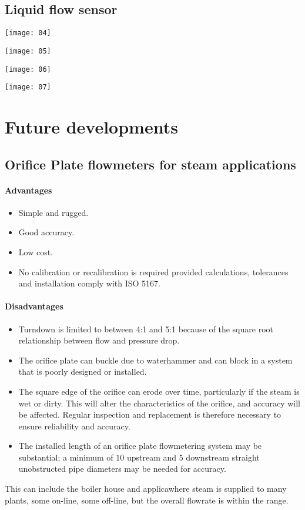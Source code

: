 \clearpage
\subsection{Liquid flow sensor}
\begin{center}
	\texttt{[image: 04]}
\end{center}
\begin{center}
	\texttt{[image: 05]}
\end{center}
\clearpage
\begin{center}
	\texttt{[image: 06]}
\end{center}
\begin{center}
	\texttt{[image: 07]}
\end{center}
\section{Future developments}
\subsection{Orifice Plate flowmeters for steam applications}
\paragraph{Advantages}
\begin{itemize}
	\item Simple and rugged.
	\item Good accuracy.
	\item Low cost.
	\item No calibration or recalibration is required provided calculations, tolerances and installation comply with ISO 5167.
\end{itemize}
\paragraph{Disadvantages}
\begin{itemize}
	\item Turndown is limited to between 4:1 and 5:1 because of the square root relationship between flow and pressure drop.
	\item The orifice plate can buckle due to waterhammer and can block in a system that is poorly designed or installed.
	\item The square edge of the orifice can erode over time, particularly if the steam is wet or dirty. This will alter the characteristics of the orifice, and accuracy will be affected. Regular inspection and replacement is therefore necessary to ensure reliability and accuracy.
	\item The installed length of an orifice plate flowmetering system may be substantial; a minimum of 10 upstream and 5 downstream straight unobstructed pipe diameters may be needed for accuracy.
\end{itemize}
This can include the boiler house and applicawhere steam is supplied to many plants, some on-line, some off-line, but the overall flowrate is within the range.

